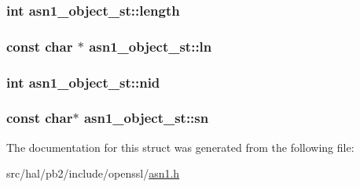 \subsubsection[{\texorpdfstring{length}{length}}]{\setlength{\rightskip}{0pt plus 5cm}int asn1\+\_\+object\+\_\+st\+::length}\hypertarget{structasn1__object__st_aebd85f3c9bec7ccf21ce77aa71c78ce1}{}\label{structasn1__object__st_aebd85f3c9bec7ccf21ce77aa71c78ce1}
\subsubsection[{\texorpdfstring{ln}{ln}}]{\setlength{\rightskip}{0pt plus 5cm}const char $\ast$ asn1\+\_\+object\+\_\+st\+::ln}\hypertarget{structasn1__object__st_a02d44fa6f642b789372cf8f57f7f0f12}{}\label{structasn1__object__st_a02d44fa6f642b789372cf8f57f7f0f12}
\subsubsection[{\texorpdfstring{nid}{nid}}]{\setlength{\rightskip}{0pt plus 5cm}int asn1\+\_\+object\+\_\+st\+::nid}\hypertarget{structasn1__object__st_a1506f26770df5e823c217dea262bd64f}{}\label{structasn1__object__st_a1506f26770df5e823c217dea262bd64f}
\subsubsection[{\texorpdfstring{sn}{sn}}]{\setlength{\rightskip}{0pt plus 5cm}const char$\ast$ asn1\+\_\+object\+\_\+st\+::sn}\hypertarget{structasn1__object__st_a354a9532f5135bf342293f28af850177}{}\label{structasn1__object__st_a354a9532f5135bf342293f28af850177}


The documentation for this struct was generated from the following file\+:\begin{DoxyCompactItemize}
\item 
src/hal/pb2/include/openssl/\hyperlink{asn1_8h}{asn1.\+h}\end{DoxyCompactItemize}
